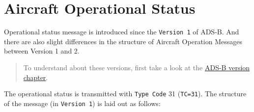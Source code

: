 \section{Aircraft Operational Status}\label{aircraft-operation-status}

Operational status message is introduced since the \texttt{Version\ 1} of ADS-B. And there are also slight differences in the structure of Aircraft Operation Messages between Version 1 and 2.

\begin{quote}
To understand about these versions, first take a look at the \href{version.html}{ADS-B version chapter}.
\end{quote}

The operational status is transmitted with \texttt{Type\ Code} 31 (\texttt{TC=31}). The structure of the message (in \texttt{Version\ 1}) is laid out as follows:

